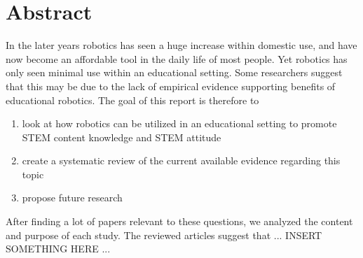\section*{Abstract}
	In the later years robotics has seen a huge increase within domestic use, and have now become an affordable tool in the daily life of most people.
	Yet robotics has only seen minimal use within an educational setting. Some researchers suggest that this may be due to the lack of empirical evidence
	supporting benefits of educational robotics. 
	The goal of this report is therefore to 
	\begin{enumerate}
		\item look at how robotics can be utilized in an educational setting to promote STEM content knowledge and STEM attitude
		\item create a systematic review of the current available evidence regarding this topic
		\item propose future research
	\end{enumerate}
	
	\bigskip\noindent
	After finding a lot of papers relevant to these questions, we analyzed the content and purpose of each study.
	The reviewed articles suggest that ... INSERT SOMETHING HERE ...	
	